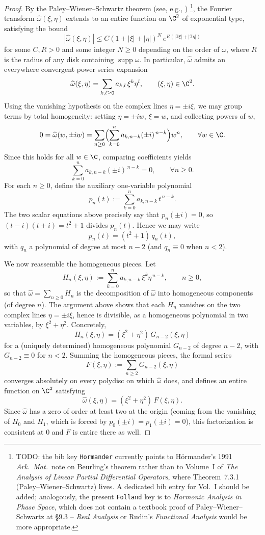 \begin{proof}
By the Paley--Wiener--Schwartz theorem (see, e.g.,
\cite{Hormander,Folland})%
\footnote{TODO: the bib key \texttt{Hormander} currently points to
H\"{o}rmander's 1991 \emph{Ark.\ Mat.}\ note on Beurling's theorem rather
than to Volume~I of \emph{The Analysis of Linear Partial Differential
Operators}, where Theorem~7.3.1 (Paley--Wiener--Schwartz) lives. A
dedicated bib entry for Vol.~I should be added; analogously, the present
\texttt{Folland} key is to \emph{Harmonic Analysis in Phase Space}, which
does not contain a textbook proof of Paley--Wiener--Schwartz at \S 9.3 --
\emph{Real Analysis} or Rudin's \emph{Functional Analysis} would be more
appropriate.}, the Fourier
transform $\widehat\omega(\xi,\eta)$ extends to an entire function on $\C^2$
of exponential type, satisfying the bound
\[
|\widehat\omega(\xi,\eta)|\le C(1+|\xi|+|\eta|)^{N}\,e^{R(|\Im\xi|+|\Im\eta|)}
\]
for some $C,R>0$ and some integer $N\ge 0$ depending on the order of
$\omega$, where $R$ is the radius of any disk containing
$\operatorname{supp}\omega$. In particular, $\widehat\omega$ admits an
everywhere convergent power series expansion
\[
\widehat{\omega}(\xi,\eta)=\sum_{k,l\ge 0} a_{k,l}\,\xi^k\eta^l,
\qquad (\xi,\eta)\in\C^2.
\]
Using the vanishing hypothesis on the complex lines $\eta=\pm i\xi$, we may
group terms by total homogeneity: setting $\eta=\pm iw$, $\xi=w$, and
collecting powers of $w$,
\[
0=\widehat{\omega}(w,\pm iw)
   =\sum_{n\ge 0}\Bigl(\sum_{k=0}^n a_{k,n-k}(\pm i)^{\,n-k}\Bigr)w^n,
\qquad \forall w\in\C.
\]
Since this holds for all $w\in\C$, comparing coefficients yields
\[
\sum_{k=0}^n a_{k,n-k}(\pm i)^{\,n-k}=0,\qquad \forall n\ge 0.
\]
For each $n\ge 0$, define the auxiliary one-variable polynomial
\[
p_n(t):=\sum_{k=0}^n a_{k,n-k}\, t^{\,n-k}.
\]
The two scalar equations above precisely say that $p_n(\pm i)=0$, so
$(t-i)(t+i)=t^2+1$ divides $p_n(t)$. Hence we may write
\[
p_n(t)=(t^2+1)\,q_n(t),
\]
with $q_n$ a polynomial of degree at most $n-2$ (and $q_n\equiv 0$ when
$n<2$).

We now reassemble the homogeneous pieces. Let
\[
H_n(\xi,\eta):=\sum_{k=0}^n a_{k,n-k}\,\xi^k\eta^{\,n-k},
\qquad n\ge 0,
\]
so that $\widehat\omega=\sum_{n\ge 0}H_n$ is the decomposition of
$\widehat\omega$ into homogeneous components (of degree $n$). The argument
above shows that each $H_n$ vanishes on the two complex lines
$\eta=\pm i\xi$, hence is divisible, as a homogeneous polynomial in two
variables, by $\xi^2+\eta^2$. Concretely,
\[
H_n(\xi,\eta)=(\xi^2+\eta^2)\,G_{n-2}(\xi,\eta)
\]
for a (uniquely determined) homogeneous polynomial $G_{n-2}$ of degree
$n-2$, with $G_{n-2}\equiv 0$ for $n<2$. Summing the homogeneous pieces, the
formal series
\[
F(\xi,\eta):=\sum_{n\ge 2} G_{n-2}(\xi,\eta)
\]
converges absolutely on every polydisc on which $\widehat\omega$ does, and
defines an entire function on $\C^2$ satisfying
\[
\widehat{\omega}(\xi,\eta)=(\xi^2+\eta^2)\,F(\xi,\eta).
\]
Since $\widehat\omega$ has a zero of order at least two at the origin
(coming from the vanishing of $H_0$ and $H_1$, which is forced by
$p_0(\pm i)=p_1(\pm i)=0$), this factorization is consistent at $0$ and $F$
is entire there as well.


\end{proof}
